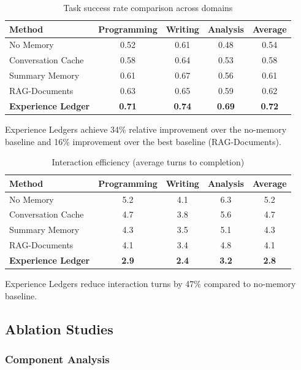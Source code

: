 \documentclass[11pt,letterpaper]{article}
\begin{document}
\begin{table}[h]
\centering
\caption{Task success rate comparison across domains}
\label{tab:success}
\begin{tabular}{lcccc}
\toprule
\textbf{Method} & \textbf{Programming} & \textbf{Writing} & \textbf{Analysis} & \textbf{Average} \\
\midrule
No Memory & 0.52 & 0.61 & 0.48 & 0.54 \\
Conversation Cache & 0.58 & 0.64 & 0.53 & 0.58 \\
Summary Memory & 0.61 & 0.67 & 0.56 & 0.61 \\
RAG-Documents & 0.63 & 0.65 & 0.59 & 0.62 \\
\textbf{Experience Ledger} & \textbf{0.71} & \textbf{0.74} & \textbf{0.69} & \textbf{0.72} \\
\bottomrule
\end{tabular}
\end{table}

Experience Ledgers achieve 34\% relative improvement over the no-memory baseline and 16\% improvement over the best baseline (RAG-Documents).

\begin{table}[h]
\centering
\caption{Interaction efficiency (average turns to completion)}
\label{tab:efficiency}
\begin{tabular}{lcccc}
\toprule
\textbf{Method} & \textbf{Programming} & \textbf{Writing} & \textbf{Analysis} & \textbf{Average} \\
\midrule
No Memory & 5.2 & 4.1 & 6.3 & 5.2 \\
Conversation Cache & 4.7 & 3.8 & 5.6 & 4.7 \\
Summary Memory & 4.3 & 3.5 & 5.1 & 4.3 \\
RAG-Documents & 4.1 & 3.4 & 4.8 & 4.1 \\
\textbf{Experience Ledger} & \textbf{2.9} & \textbf{2.4} & \textbf{3.2} & \textbf{2.8} \\
\bottomrule
\end{tabular}
\end{table}

Experience Ledgers reduce interaction turns by 47\% compared to no-memory baseline.

\subsection{Ablation Studies}

\subsubsection{Component Analysis}
\end{document}
